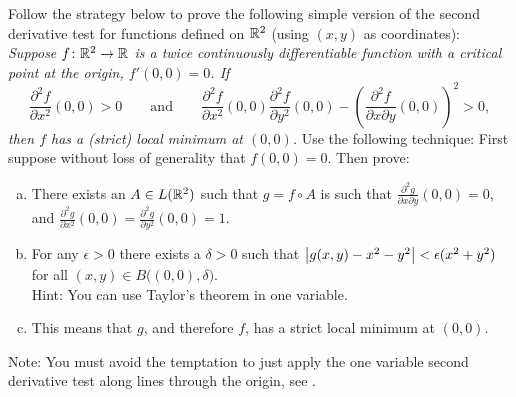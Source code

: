 \begin{samepage}
\begin{exercise}
Follow the strategy below to
prove the following simple version of the second derivative test for
functions defined on ${\mathbb{R}}^2$ (using $(x,y)$ as coordinates):  \emph{Suppose $f \colon {\mathbb{R}}^2
\to {\mathbb{R}}$ is a twice continuously differentiable function with a
critical point at the origin, $f'(0,0) = 0$.  If
\begin{equation*}
\frac{\partial^2 f}{\partial x^2} (0,0) > 0 \qquad \text{and} \qquad
\frac{\partial^2 f}{\partial x^2} (0,0) \frac{\partial^2 f}{\partial y^2}
(0,0) -
{\left(\frac{\partial^2 f}{\partial x \partial y} (0,0) \right)}^2 > 0 ,
\end{equation*}
then $f$ has a (strict) local minimum at $(0,0)$.}
Use the following technique:  First suppose without loss of generality
that $f(0,0) = 0$.  Then prove:
\begin{enumerate}[a)]
\item
There exists an $A \in L({\mathbb{R}}^2)$ such that $g = f \circ A$ is
such that $\frac{\partial^2 g}{\partial x \partial y} (0,0) = 0$, and
$\frac{\partial^2 g}{\partial x^2} (0,0) =
\frac{\partial^2 g}{\partial y^2} (0,0) = 1$.
\item
For any $\epsilon > 0$ there exists a $\delta > 0$
such that 
$\left\lvert {g(x,y) - x^2 - y^2} \right\rvert < \epsilon (x^2+y^2)$ for all
$(x,y) \in B\bigl((0,0),\delta\bigr)$.\\
Hint: You can use Taylor's theorem in one variable.
\item
This means that $g$, and therefore $f$, has a strict local
minimum at $(0,0)$.
\end{enumerate}
Note: You must avoid the temptation to just
apply the one variable second derivative test along lines through the
origin, see .
\end{exercise}
\end{samepage}
